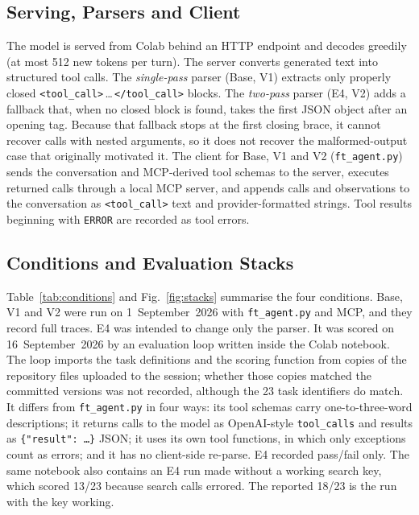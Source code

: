 \documentclass[runningheads]{llncs}
\begin{document}
\subsection{Serving, Parsers and Client}
\label{sec:runtime}

The model is served from Colab behind an HTTP endpoint and decodes greedily (at most 512 new tokens per turn). The server converts generated text into structured tool calls. The \emph{single-pass} parser (Base, V1) extracts only properly closed \texttt{<tool\_call>}\,\ldots\,\texttt{</tool\_call>} blocks. The \emph{two-pass} parser (E4, V2) adds a fallback that, when no closed block is found, takes the first JSON object after an opening tag. Because that fallback stops at the first closing brace, it cannot recover calls with nested arguments, so it does not recover the malformed-output case that originally motivated it. The client for Base, V1 and V2 (\texttt{ft\_agent.py}) sends the conversation and MCP-derived tool schemas to the server, executes returned calls through a local MCP server, and appends calls and observations to the conversation as \texttt{<tool\_call>} text and provider-formatted strings. Tool results beginning with \texttt{ERROR} are recorded as tool errors.

\subsection{Conditions and Evaluation Stacks}
\label{sec:conditions}

Table~\ref{tab:conditions} and Fig.~\ref{fig:stacks} summarise the four conditions. Base, V1 and V2 were run on 1~September~2026 with \texttt{ft\_agent.py} and MCP, and they record full traces. E4 was intended to change only the parser. It was scored on 16~September~2026 by an evaluation loop written inside the Colab notebook. The loop imports the task definitions and the scoring function from copies of the repository files uploaded to the session; whether those copies matched the committed versions was not recorded, although the 23 task identifiers do match. It differs from \texttt{ft\_agent.py} in four ways: its tool schemas carry one-to-three-word descriptions; it returns calls to the model as OpenAI-style \texttt{tool\_calls} and results as \texttt{\{"result": \ldots\}} JSON; it uses its own tool functions, in which only exceptions count as errors; and it has no client-side re-parse. E4 recorded pass/fail only. The same notebook also contains an E4 run made without a working search key, which scored 13/23 because search calls errored. The reported 18/23 is the run with the key working.
\end{document}
